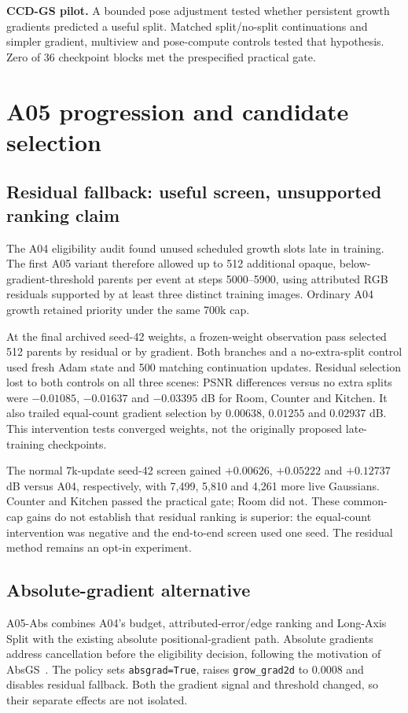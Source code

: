 \documentclass[11pt,a4paper]{article}
\begin{document}
\textbf{CCD-GS pilot.} A bounded pose adjustment tested whether persistent
growth gradients predicted a useful split. Matched split/no-split
continuations and simpler gradient, multiview and pose-compute controls
tested that hypothesis. Zero of 36 checkpoint blocks met the prespecified
practical gate.

\clearpage
\section{A05 progression and candidate selection}
\label{sec:a05}
\subsection{Residual fallback: useful screen, unsupported ranking claim}
The A04 eligibility audit found unused scheduled growth slots late in
training. The first A05 variant therefore allowed up to 512 additional
opaque, below-gradient-threshold parents per event at steps 5000--5900,
using attributed RGB residuals supported by at least three distinct training
images. Ordinary A04 growth retained priority under the same 700k cap.

At the final archived seed-42 weights, a frozen-weight observation pass
selected 512 parents by residual or by gradient. Both branches and a
no-extra-split control used fresh Adam state and 500 matching continuation
updates. Residual selection lost to both controls on all three scenes:
PSNR differences versus no extra splits were $-0.01085$, $-0.01637$ and
$-0.03395$ dB for Room, Counter and Kitchen. It also trailed equal-count
gradient selection by $0.00638$, $0.01255$ and $0.02937$ dB. This intervention
tests converged weights, not the originally proposed late-training checkpoints.

The normal 7k-update seed-42 screen gained $+0.00626$, $+0.05222$ and
$+0.12737$ dB versus A04, respectively, with 7,499, 5,810 and 4,261 more
live Gaussians. Counter and Kitchen passed the practical gate; Room did not.
These common-cap gains do not establish that residual ranking is superior:
the equal-count intervention was negative and the end-to-end screen used
one seed. The residual method remains an opt-in experiment.

\subsection{Absolute-gradient alternative}
A05-Abs combines A04's budget, attributed-error/edge ranking and Long-Axis
Split with the existing absolute positional-gradient path. Absolute gradients
address cancellation before the eligibility decision, following the motivation
of AbsGS~\cite{absgs}. The policy sets \texttt{absgrad=True}, raises
\texttt{grow\_grad2d} to 0.0008 and disables residual fallback. Both the gradient
signal and threshold changed, so their separate effects are not isolated.
\end{document}
